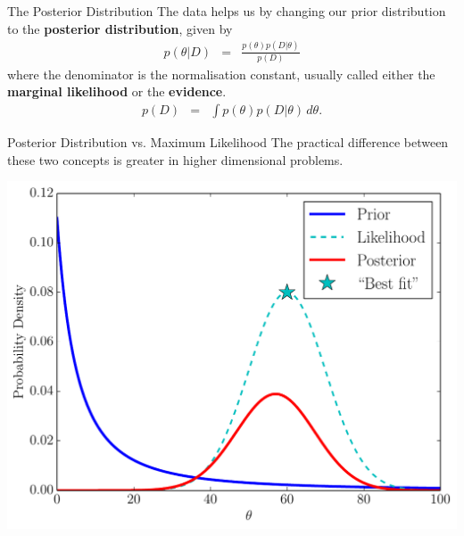 \documentclass{beamer}
\begin{document}
\begin{frame}[t]{The Posterior Distribution}
The data helps us by changing our prior distribution to the {\bf posterior
distribution}, given by
\begin{eqnarray*}
p(\theta | D) &=& \frac{p(\theta) p(D|\theta)}{p(D)}
\end{eqnarray*}
where the denominator is the normalisation constant, usually called either
the {\bf marginal likelihood} or the {\bf evidence}.
\begin{eqnarray*}
p(D) &=& \int p(\theta)p(D|\theta) \, d\theta.
\end{eqnarray*}

\end{frame}

\begin{frame}[t]{Posterior Distribution vs. Maximum Likelihood}
The practical difference between these two concepts is greater in higher
dimensional problems.
\begin{center}
\includegraphics[scale=0.35]{figures/bayes.pdf}
\end{center}
\end{frame}
\end{document}
